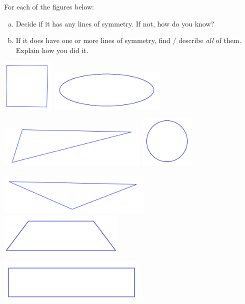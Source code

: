 \begin{problem}
For each of the figures below:
\begin{enumerate}[(a)]
\item
Decide if it has any lines of symmetry.  If not, how do you know?\\
\item
If it does have one or more lines of symmetry, find / describe \emph{all} of them.    Explain how you did it.\\
\end{enumerate}

\begin{center}
\includegraphics[height=2.5cm]{smsq}
\qquad \qquad
\includegraphics[height=2cm]{ellipse}

\bigskip

\includegraphics[height=2cm]{scatri}
\qquad \qquad
\includegraphics[height=2.5cm]{circle}

\bigskip

\includegraphics[height=2cm]{scaltri}
\includegraphics[height=2cm]{trap1}


\bigskip

\includegraphics[height=2cm]{rect}


\end{center}

\end{problem}

